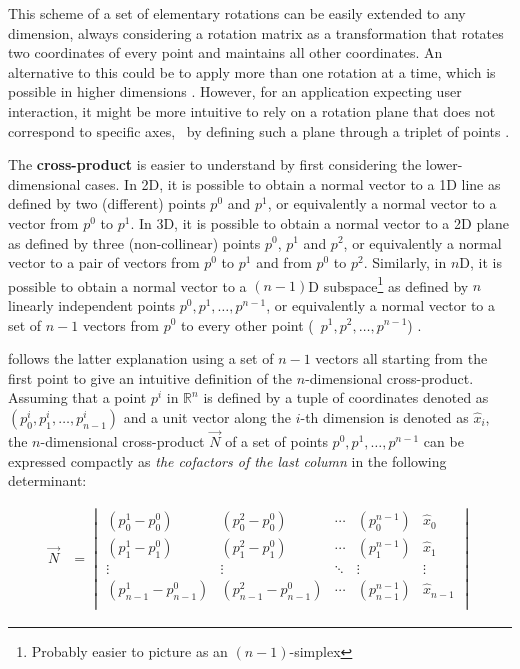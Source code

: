 This scheme of a set of elementary rotations can be easily extended to any dimension, always considering a rotation matrix as a transformation that rotates two coordinates of every point and maintains all other coordinates.
An alternative to this could be to apply more than one rotation at a time, which is possible in higher dimensions \citep{vanElfrinkhof97}.
However, for an application expecting user interaction, it might be more intuitive to rely on a rotation plane that does not correspond to specific axes, \eg\ by defining such a plane through a triplet of points \citep{Hanson94}.

The \textbf{cross-product} is easier to understand by first considering the lower-dimensional cases.
In 2D, it is possible to obtain a normal vector to a 1D line as defined by two (different) points $p^0$ and $p^1$, or equivalently a normal vector to a vector from $p^0$ to $p^1$.
In 3D, it is possible to obtain a normal vector to a 2D plane as defined by three (non-collinear) points $p^0$, $p^1$ and $p^2$, or equivalently a normal vector to a pair of vectors from $p^0$ to $p^1$ and from $p^0$ to $p^2$.
Similarly, in $n$D, it is possible to obtain a normal vector to a $(n-1)$D subspace\footnote{Probably easier to picture as an $(n-1)$-simplex} as defined by $n$ linearly independent points $p^0, p^1, \ldots, p^{n-1}$, or equivalently a normal vector to a set of $n-1$ vectors from $p^0$ to every other point (\ie\ $p^1, p^2, \ldots, p^{n-1}$) \citep{Massey83,Elduque04}.

\citet{Hanson94} follows the latter explanation using a set of $n-1$ vectors all starting from the first point to give an intuitive definition of the $n$-dimensional cross-product.
Assuming that a point $p^i$ in $\mathbb{R}^n$ is defined by a tuple of coordinates denoted as $(p^i_0, p^i_1, \ldots, p^i_{n-1})$ and a unit vector along the $i$-th dimension is denoted as $\hat{x}_i$, the $n$-dimensional cross-product $\vec{N}$ of a set of points $p^0, p^1, \ldots, p^{n-1}$ can be expressed compactly as \emph{the cofactors of the last column} in the following determinant:

\begin{align*}
\vec{N} &= \begin{vmatrix}
(p^1_0 - p^0_0) & (p^2_0 - p^0_0) & \cdots & (p^{n-1}_0) & \hat{x}_0 \\
(p^1_1 - p^0_1) & (p^2_1 - p^0_1) & \cdots & (p^{n-1}_1) & \hat{x}_1 \\
\vdots & \vdots & \ddots & \vdots & \vdots \\
(p^1_{n-1} - p^0_{n-1}) & (p^2_{n-1} - p^0_{n-1}) & \cdots & (p^{n-1}_{n-1}) & \hat{x}_{n-1} \\
\end{vmatrix}
\end{align*}


